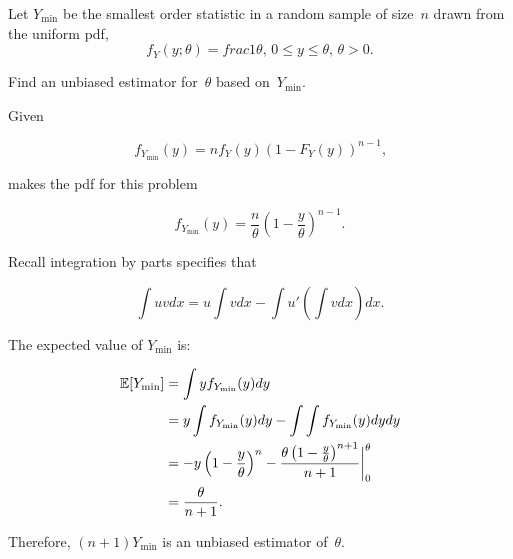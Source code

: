 \begin{problem}
   Let $Y_{\min}$ be the smallest order statistic in a random sample of size~$n$ drawn from the uniform pdf,
  \begin{equation*}
    f_Y(y;\theta) = frac{1}{\theta}\text{, } 0 \leq y \leq \theta \text{, } \theta >0\text{.}
  \end{equation*}

  Find an unbiased estimator for~$\theta$ based on~$Y_{\min}$.
\end{problem}

Given

\begin{equation}
  f_{Y_{\min}}(y) = n f_Y(y) (1 - F_Y(y))^{n-1}\text{,}
\end{equation}

\noindent
makes the pdf for this problem

\begin{equation}
  f_{Y_{\min}}(y) = \frac{n}{\theta} \left(1 - \frac{y}{\theta} \right)^{n-1}\text{.}
\end{equation}

Recall integration by parts specifies that

\begin{equation}
  \int uv dx = u\int v dx - \int u' \left( \int v dx \right) dx \text{.}
\end{equation}

\noindent
The expected value of $Y_{\min}$ is:

\begin{align*}
  \mathbb{E}\lbrack Y_{\min}\rbrack &= \int y f_{Y_{\min}}(y) dy \\
                    &= y\int f_{Y_{\min}}(y) dy - \int \int f_{Y_{\min}}(y) dy dy \\
                    &= -y\left(1 - \frac{y}{\theta}\right)^{n}- \frac{\theta \left(1 - \frac{y}{\theta}\right)^{n+1}}{n+1} \bigg\vert_{0}^{\theta} \\
                    &= \frac{\theta}{n+1}\text{.}
 \end{align*}

 Therefore, $\boxed{(n+1)Y_{\min}}$ is an unbiased estimator of~$\theta$.
